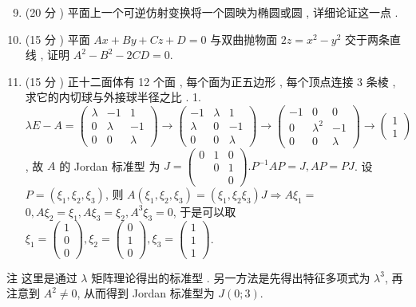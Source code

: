 \documentclass[10pt]{article}
\begin{document}
\begin{enumerate}
  \setcounter{enumi}{8}
  \item (20  分 )  平面上一个可逆仿射变换将一个圆映为椭圆或圆 ,  详细论证这一点 .

  \item (15  分 )  平面  $A x+B y+C z+D=0$  与双曲抛物面  $2 z=x^{2}-y^{2}$  交于两条直线 ,  证明  $A^{2}-B^{2}-2 C D=0$.

  \item (15  分 )  正十二面体有  12  个面 ,  每个面为正五边形 ,  每个顶点连接  3  条棱 ,  求它的内切球与外接球半径之比 . 1. $\lambda E-A=\left(\begin{array}{ccc}\lambda & -1 & 1 \\ 0 & \lambda & -1 \\ 0 & 0 & \lambda\end{array}\right) \rightarrow\left(\begin{array}{ccc}-1 & \lambda & 1 \\ \lambda & 0 & -1 \\ 0 & 0 & \lambda\end{array}\right) \rightarrow\left(\begin{array}{ccc}-1 & 0 & 0 \\ 0 & \lambda^{2} & -1 \\ 0 & 0 & \lambda\end{array}\right) \rightarrow\left(\begin{array}{c}1 \\ 1\end{array}\right)$,  故  $A$  的  Jordan  标准型   为  $J=\left(\begin{array}{ccc}0 & 1 & 0 \\ & 0 & 1 \\ & & 0\end{array}\right) . P^{-1} A P=J, A P=P J$.  设  $P=\left(\xi_{1}, \xi_{2}, \xi_{3}\right)$,  则  $A\left(\xi_{1}, \xi_{2}, \xi_{3}\right)=\left(\xi_{1}, \xi_{2} \xi_{3}\right) J \Longrightarrow A \xi_{1}=$ $0, A \xi_{2}=\xi_{1}, A \xi_{3}=\xi_{2}, A^{3} \xi_{3}=0$,  于是可以取  $\xi_{1}=\left(\begin{array}{l}1 \\ 0 \\ 0\end{array}\right), \xi_{2}=\left(\begin{array}{l}0 \\ 1 \\ 0\end{array}\right), \xi_{3}=\left(\begin{array}{l}1 \\ 1 \\ 1\end{array}\right)$.

\end{enumerate}
 注   这里是通过  $\lambda$  矩阵理论得出的标准型 .  另一方法是先得出特征多项式为  $\lambda^{3}$,  再注意到  $A^{2} \neq 0$,  从而得到  Jordan  标准型为  $J(0 ; 3)$.
\end{document}
